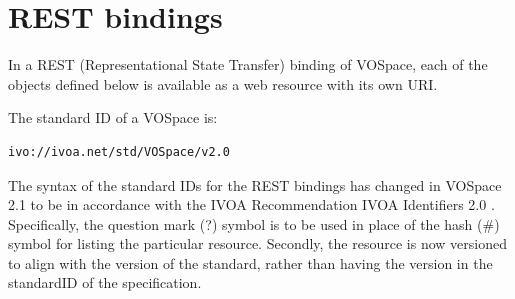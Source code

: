\documentclass[11pt,a4paper]{ivoa}
\begin{document}
% 
% 
% 
% 

\section{REST bindings}
\label{sec:rest bindings}
In a REST (Representational State Transfer) binding of VOSpace, each of the objects defined below is available as a web resource with its own URI.

The standard ID of a VOSpace is:

\begin{verbatim}ivo://ivoa.net/std/VOSpace/v2.0\end{verbatim}

The syntax of the standard IDs for the REST bindings has changed in VOSpace 2.1 to be in accordance with the IVOA Recommendation IVOA Identifiers 2.0 \citep{std:VOID}.  Specifically, the question mark (?) symbol is to be used in place of the hash (\#) symbol for listing the particular resource.  Secondly, the resource is now versioned to align with the version of the standard, rather than having the version in the standardID of the specification.
\end{document}
